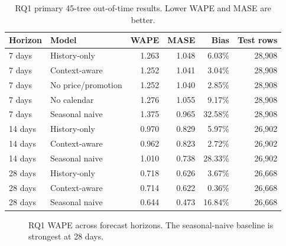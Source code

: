 \begin{table}[htbp]
\centering
\small
\begin{tabular}{llrrrr}
\toprule
\textbf{Horizon} & \textbf{Model} & \textbf{WAPE} & \textbf{MASE} & \textbf{Bias} & \textbf{Test rows}\\
\midrule
7 days & History-only & 1.263 & 1.048 & 6.03\% & 28,908\\
7 days & Context-aware & 1.252 & 1.041 & 3.04\% & 28,908\\
7 days & No price/promotion & 1.252 & 1.040 & 2.85\% & 28,908\\
7 days & No calendar & 1.276 & 1.055 & 9.17\% & 28,908\\
7 days & Seasonal naive & 1.375 & 0.965 & 32.58\% & 28,908\\
\midrule
14 days & History-only & 0.970 & 0.829 & 5.97\% & 26,902\\
14 days & Context-aware & 0.962 & 0.823 & 2.72\% & 26,902\\
14 days & Seasonal naive & 1.010 & 0.738 & 28.33\% & 26,902\\
\midrule
28 days & History-only & 0.718 & 0.626 & 3.67\% & 26,668\\
28 days & Context-aware & 0.714 & 0.622 & 0.36\% & 26,668\\
28 days & Seasonal naive & 0.644 & 0.473 & 16.84\% & 26,668\\
\bottomrule
\end{tabular}
\caption{RQ1 primary 45-tree out-of-time results. Lower WAPE and MASE are better.}
\label{tab:rq1_primary}
\end{table}

\begin{figure}[htbp]
\centering
{}
\caption{RQ1 WAPE across forecast horizons. The seasonal-naive baseline is strongest at 28 days.}
\label{fig:rq1_wape}
\end{figure}

